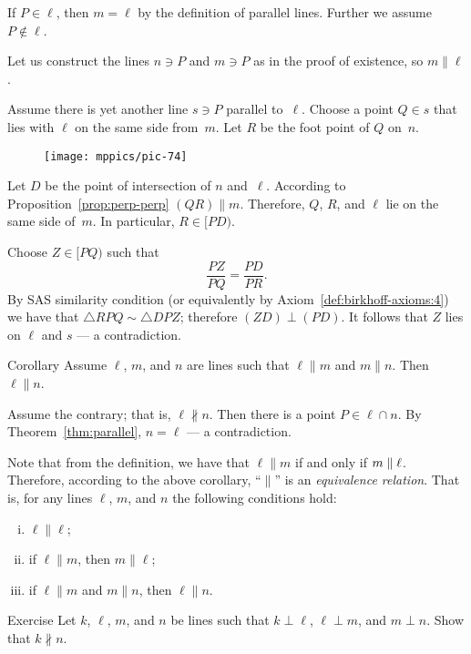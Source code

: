If $P\in\ell$, then $m=\ell$ by the definition of parallel lines.
Further we assume $P\notin\ell$.

Let us construct the lines $n\ni P$ and $m\ni P$ as in the proof of existence, so $m\parallel \ell$.

Assume there is yet another line $s\ni P$ parallel to~$\ell$.
Choose a point $Q\in s$ that lies with $\ell$ on the same side from~$m$.
Let $R$ be the foot point of $Q$ on~$n$.

\begin{figure}[!ht]
\centering
\texttt{[image: mppics/pic-74]}
\end{figure}

Let $D$ be the point of intersection of $n$ and~$\ell$.
According to Proposition~\ref{prop:perp-perp} $(QR)\parallel m$. 
Therefore, $Q$, $R$, and $\ell$ lie on the same side of~$m$. 
In particular, $R\in [P D)$.

Choose $Z\in [P Q)$ such that 
$$\frac{PZ}{PQ}=\frac{PD}{PR}.$$
By SAS similarity condition (or equivalently by Axiom~\ref{def:birkhoff-axioms:4})
we have that $\triangle RPQ\sim \triangle DPZ$;
therefore $(Z D)\perp(P D)$.
It follows that $Z$ lies on $\ell$ and $s$ --- a contradiction.\qeds

\begin{thm}{Corollary}\label{cor:parallel-1}
Assume $\ell$, $m$, and $n$ are lines
such that $\ell\parallel m$ and $m\parallel n$.
Then $\ell\parallel n$.
\end{thm}

Assume the contrary; that is, $\ell\nparallel n$.
Then there is a point $P\in \ell\cap n$.
By Theorem~\ref{thm:parallel},
$n=\ell$ --- a contradiction.
\qeds

Note that from the definition, we have that $\ell\parallel m$ if and only if $m\z\parallel \ell$.
Therefore, according to the above corollary, ``$\parallel$'' is an 
\emph{equivalence relation}.
That is, for any lines $\ell$, $m$, and $n$ the following conditions hold:
\begin{enumerate}[(i)]
\item $\ell\parallel \ell$;
\item if $\ell\parallel m$, then $m\parallel \ell$;
\item if $\ell\parallel m$ and $m\parallel n$, then 
$\ell\parallel n$.
\end{enumerate}

\begin{thm}{Exercise}\label{ex:perp-perp}
Let $k$, $\ell$, $m$, and $n$ be lines such that $k\perp \ell$, $\ell\perp m$, and $m\perp n$.
Show that $k\nparallel n$.
\end{thm}

